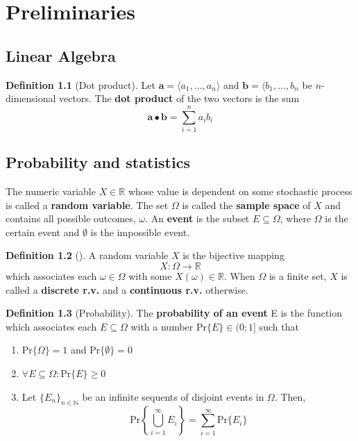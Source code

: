 \documentclass[a4paper, 12pt]{report}
\theoremstyle{definition}
\newtheorem{definition}{Definition}[chapter]
\begin{document}
\appendix

\newpage

\chapter{Preliminaries}
\section{Linear Algebra}
\begin{definition}[Dot product]
    Let $\mathbf a = \langle a_1, \ldots, a_n \rangle$ and $\mathbf b = \langle b_1, \ldots, b_n$ be $n$-dimensional vectors. The \textbf{dot product} of the two vectors is the sum
    \[
        \mathbf a \bullet \mathbf b = \sum_{i = 1}^n a_i b_i
    \]
\end{definition}
\section{Probability and statistics}
The numeric variable $X \in \mathbb R$ whose value is dependent on some stochastic process is called a \textbf{random variable}. The set $\Omega$ is called the \textbf{sample space} of $X$ and contains all possible outcomes, $\omega$. An \textbf{event} is the subset $E \subseteq \Omega$, where $\Omega$ is the certain event and $\emptyset$ is the impossible event.

\begin{definition}[]
    A random variable $X$ is the bijective mapping
    \[
        X: \Omega \to \mathbb R
    \]
    which associates each $\omega \in \Omega$ with some $X(\omega) \in \mathbb R$. When $\Omega$ is a finite set, $X$ is called a \textbf{discrete r.v.} and a \textbf{continuous r.v.} otherwise.
\end{definition}

\begin{definition}[Probability]
    The \textbf{probability of an event} E is the function which associates each $E \subseteq \Omega$ with a number $\text{Pr}\{E\} \in (0;1]$ such that
    \begin{enumerate}
        \item Pr$\{\Omega\} = 1$ and Pr$\{\emptyset\} = 0$
        \item $\forall E \subseteq \Omega: \text{Pr}\{E\} \geq 0$
        \item Let $\{E_n\}_{n \in \mathbb N}$ be an infinite sequents of disjoint events in $\Omega$. Then,
        \[
            \text{Pr}\left\{\bigcup_{i = 1}^\infty E_i\right\} = \sum_{i = 1}^\infty \text{Pr}\{E_i\}
        \]
    \end{enumerate}
\end{definition}
\end{document}

